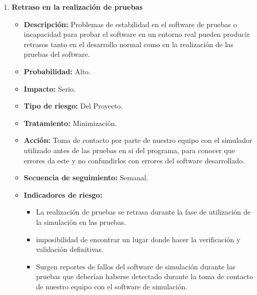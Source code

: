\begin{enumerate}
    \item \textbf{Retraso en la realización de pruebas}
    
    \begin{itemize}
    \item \textbf{Descripción:} Problemas de estabilidad en el software de pruebas o incapacidad para probar el software en un entorno real pueden producir retrasos tanto en el desarrollo normal como en la realización de las pruebas del software.
    \item \textbf{Probabilidad:} Alto.
    \item \textbf{Impacto:} Serio.
    \item \textbf{Tipo de riesgo:} Del Proyecto.
    \item \textbf{Tratamiento:} Minimización.
    \item \textbf{Acción:} Toma de contacto por parte de nuestro equipo con el simulador utilizado antes de las pruebas en si del programa, para conocer que errores da este y no confundirlos con errores del software desarrollado.
    \item \textbf{Secuencia de seguimiento:} Semanal.
    \item \textbf{Indicadores de riesgo:} 
    \begin{itemize}
        \item La realización de pruebas se retrasa durante la fase de utilización de la simulación en las pruebas.
        \item imposibilidad de encontrar un lugar donde hacer la verificación y validación definitivas.
        \item Surgen reportes de fallos del software de simulación durante las pruebas que deberían haberse detectado durante la toma de contacto de nuestro equipo con el software de simulación.
    \end{itemize}
    \end{itemize}


\end{enumerate}
